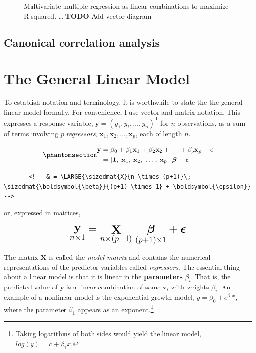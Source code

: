 \documentclass[
  letterpaper,
  10pt,
  krantz2]{krantz}
\begin{document}
{\begin{figure}
{}

\caption{\label{fig-lin-comb3}Multivariate multiple regression as linear
combinations to maximize R squared. \ldots{} \textbf{TODO} Add vector
diagram}

\end{figure}%

\subsection{Canonical correlation
analysis}\label{canonical-correlation-analysis}

\section{The General Linear Model}\label{the-general-linear-model}

To establish notation and terminology, it is worthwhile to state the the
general linear model formally. For convenience, I use vector and matrix
notation. This expresses a response variable,
\(\mathbf{y} = (y_1, y_2, \dots , y_n)^\textsf{T}\) for \(n\)
observations, as a sum of terms involving \(p\) \emph{regressors},
\(\mathbf{x}_1, \mathbf{x}_2, \dots , \mathbf{x}_p\), each of length
\(n\).

\begin{equation}\phantomsection\label{eq-glm}{
\begin{align*}
\mathbf{y} & = \beta_0 + \beta_1 \mathbf{x}_1 + \beta_2 \mathbf{x}_2 + \cdots + \beta_p \mathbf{x}_p + \mathbf{\epsilon} \\
           & = \left[ \mathbf{1},\; \mathbf{x}_1,\; \mathbf{x}_2,\; \dots ,\; \mathbf{x}_p \right] \; \boldsymbol{\beta} + \boldsymbol{\epsilon} \\
\end{align*}
}\end{equation}

\begin{verbatim}
       <!-- & = \LARGE{\sizedmat{X}{n \times (p+1)}\; \sizedmat{\boldsymbol{\beta}}{(p+1) \times 1} + \boldsymbol{\epsilon}} -->
\end{verbatim}

or, expressed in matrices,

\[
\LARGE{\mathord{\mathop{\mathbf{y}}\limits_{n \times 1}} = \mathord{\mathop{\mathbf{X}}\limits_{n \times (p+1)}}\; \mathord{\mathop{\mathbf{\boldsymbol{\beta}}}\limits_{(p+1) \times 1}} + \boldsymbol{\epsilon}}
\]

The matrix \(\mathbf{X}\) is called the \emph{model matrix} and contains
the numerical representations of the predictor variables called
\emph{regressors}. The essential thing about a linear model is that it
is linear in the \textbf{parameters} \(\beta_i\). That is, the predicted
value of \(\mathbf{y}\) is a linear combination of some \(\mathbf{x}_i\)
with weights \(\beta_i\). An example of a nonlinear model is the
exponential growth model, \(y = \beta_0 + e^{\beta_1 x}\), where the
parameter \(\beta_1\) appears as an exponent.\footnote{Taking logarithms
  of both sides would yield the linear model,
  \(log(y) = c + \beta_1 x\).}

}
\end{document}
